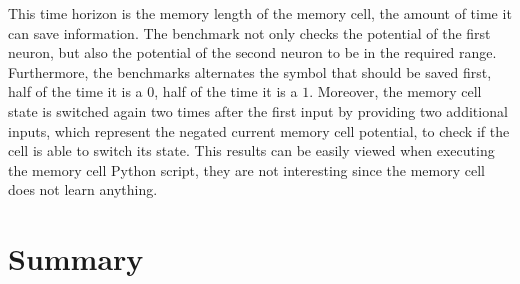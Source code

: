\documentclass[draft,final]{vutinfth} %
\begin{document}
    This time horizon is the memory length of the memory cell, the amount of time it can save information.
    The benchmark not only checks the potential of the first neuron, but also the potential of the second neuron to be in the required range.
    Furthermore, the benchmarks alternates the symbol that should be saved first, half of the time it is a $0$, half of the time it is a $1$.
    Moreover, the memory cell state is switched again two times after the first input by providing two additional inputs, which represent the negated current memory cell potential, to check if the cell is able to switch its state.
    This results can be easily viewed when executing the memory cell Python script, they are not interesting since the memory cell does not learn anything.


    \chapter{Summary}


    \backmatter

    \listoffigures %

    \cleardoublepage %
    \listoftables %


    \printindex

    \printglossaries

    
    
\end{document}
